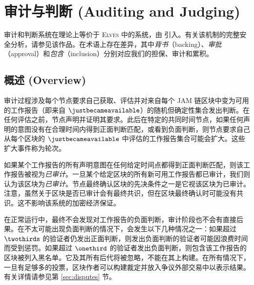 \section{审计与判断 (Auditing and Judging)}\label{sec:auditing}

审计和判断系统在理论上等价于 \textsc{Elves} 中的系统，由 \cite{cryptoeprint:2024/961} 引入。有关该机制的完整安全分析，请参见该作品。在术语上存在差异，其中\emph{背书}（backing）、\emph{审批}（approval）和\emph{包含}（inclusion）分别对应我们的担保、审计和累积。


\subsection{概述 (Overview)}

审计过程涉及每个节点要求自己获取、评估并对来自每个 JAM 链区块中变为可用的工作报告（即来自 $\justbecameavailable$）的随机但确定性集合发出判断。在任何评估之前，节点声明并证明其要求。此后在特定的共同时间节点，如果任何声明的意图没有在合理时间内得到正面判断匹配，或看到负面判断，则节点要求自己从每个区块的 $\justbecameavailable$ 中评估的工作报告集合可能会扩大。这些扩大事件称为轮次。

如果某个工作报告的所有声明意图在任何给定时间点都得到正面判断匹配，则该工作报告被视为\emph{已审计}。一旦某个给定区块的所有新可用工作报告都已审计，我们则认为该区块为\emph{已审计}。节点最终确认区块的先决条件之一是它视该区块为已审计。注意，虽然关于区块是否已审计会有最终共识，但在区块最终确认时可能没有共识。这不影响该系统的加密经济保证。

在正常运行中，最终不会发现对工作报告的负面判断，审计阶段也不会有直接后果。在不太可能出现负面判断的情况下，会发生以下几种情况之一：如果超过 $\twothirds$ 的验证者仍发出正面判断，则发出负面判断的验证者可能因浪费时间而受到惩罚。如果超过 $\onethird$ 的验证者发出负面判断，则包含该工作报告的区块被列入黑名单。它及其所有后代将被忽略，不能在其上构建。在所有情况下，一旦有足够多的投票，区块作者可以构建裁定并放入争议外部交易中以表示结果。有关详情请参见第 \ref{sec:disputes} 节。

